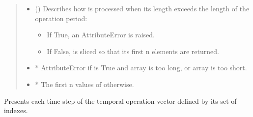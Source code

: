 \documentclass[letterpaper,10pt,english]{sphinxmanual}
\begin{document}
\begin{fulllineitems}
\begin{fulllineitems}
\begin{quote}
\begin{description}
\begin{itemize}
\item {} 
\sphinxAtStartPar
{} (\sphinxstyleliteralemphasis{\sphinxupquote{, }}\sphinxstyleliteralemphasis{\sphinxupquote{, }}) \textendash{} 
\sphinxAtStartPar
Describes how  is processed when its length exceeds the length of the operation period:
\begin{itemize}
\item {} 
\sphinxAtStartPar
If True, an AttributeError is raised.

\item {} 
\sphinxAtStartPar
If False,  is sliced so that its first n elements are returned.

\end{itemize}


\end{itemize}

\sphinxAtStartPar
\begin{itemize}
\item {} 
\sphinxAtStartPar
* AttributeError if  is True and array is too long, or array is too short.

\item {} 
\sphinxAtStartPar
* The first n values of  otherwise.

\end{itemize}


\end{description}\end{quote}

\end{fulllineitems}


\begin{fulllineitems}
\label{\detokenize{generated/tamos.TimeSettings:tamos.TimeSettings.time_steps}}
\pysigstartsignatures
{}
\pysigstopsignatures
\sphinxAtStartPar
Presents each time step of the temporal operation vector defined by its set of indexes.

\end{fulllineitems}


\end{fulllineitems}
\end{document}
